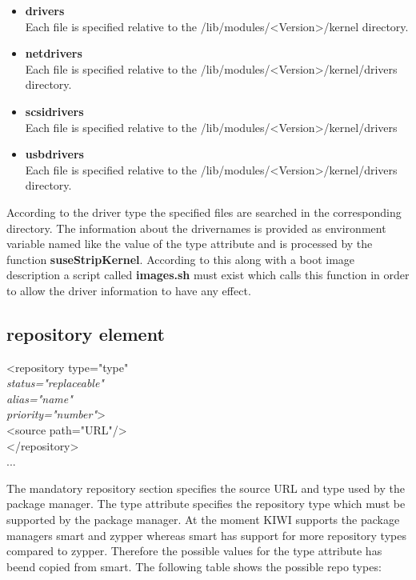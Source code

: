 \begin{itemize}
\item \textbf{drivers}\\
      Each file is specified relative to the
      /lib/modules/<Version>/kernel directory.
\item \textbf{netdrivers}\\
      Each file is specified relative to the
      /lib/modules/<Version>/kernel/drivers
      directory.
\item \textbf{scsidrivers}\\
      Each file is specified relative to the
      /lib/modules/<Version>/kernel/drivers
\item \textbf{usbdrivers}\\
      Each file is specified relative to the
      /lib/modules/<Version>/kernel/drivers directory.
\end{itemize}

According to the driver type the specified files are searched in
the corresponding directory. The information about the drivernames
is provided as environment variable named like the value of
the type attribute and is processed by the function
\textbf{suseStripKernel}. According to this along with a boot image
description a script called \textbf{images.sh} must exist which
calls this function in order to allow the driver information to
have any effect.


\subsection{repository element}
\begin{Command}{12cm}
<repository type="type"\\
\hspace*{1cm}\textit{status="replaceable"}\\
\hspace*{1cm}\textit{alias="name"}\\
\hspace*{1cm}\textit{priority="number"}>\\
\hspace*{2cm}<source path="URL"/>\\
</repository>\\
...
\end{Command}

The mandatory repository section specifies the source URL and
type used by the package manager. The type attribute specifies the
repository type which must be supported by the package manager.
At the moment KIWI supports the package managers smart and zypper
whereas smart has support for more repository types compared to
zypper. Therefore the possible values for the type attribute has
beend copied from smart. The following table shows the possible
repo types:\\ 

